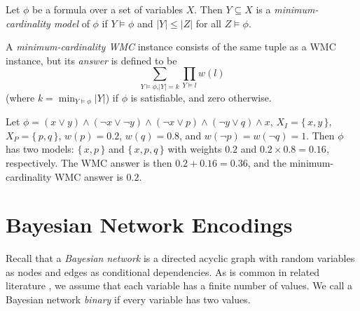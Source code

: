 \begin{definition}
  Let $\phi$ be a formula over a set of variables $X$. Then $Y \subseteq X$ is a
  \emph{minimum-cardinality model} of $\phi$ if $Y \models \phi$ and $|Y| \le
  |Z|$ for all $Z \models \phi$.
\end{definition}

\begin{definition}\label{def:mcwmc}
  A \emph{minimum-cardinality WMC} instance consists of the same tuple as a WMC
  instance, but its \emph{answer} is defined to be
  \[
  \sum_{Y \models \phi\text{,}|Y| = k} \prod_{Y \models l} w(l)
  \]
  (where $k = \min_{Y \models \phi} |Y|$) if $\phi$ is satisfiable, and zero otherwise.
\end{definition}

\begin{example}\label{example:1}
  Let
  $\phi = (x \lor y) \land (\neg x \lor \neg y) \land (\neg x \lor p) \land (\neg y \lor q) \land x$,
  $X_I = \{\, x, y \,\}$, $X_P = \{\, p, q \,\}$, $w(p) = 0.2$, $w(q) = 0.8$,
  and $w(\neg p) = w(\neg q) = 1$. Then $\phi$ has two models: $\{\, x, p \,\}$
  and $\{\, x, p, q \,\}$ with weights $0.2$ and $0.2 \times 0.8 = 0.16$,
  respectively. The WMC answer is then $0.2 + 0.16 = 0.36$, and the
  minimum-cardinality WMC answer is $0.2$.
\end{example}

\section{Bayesian Network Encodings}\label{sec:encodings}

Recall that a \emph{Bayesian network} is a directed acyclic graph with random
variables as nodes and edges as conditional dependencies. As is common in
related literature \citep{DBLP:conf/kr/Darwiche02,DBLP:conf/aaai/SangBK05}, we
assume that each variable has a finite number of values. We call a Bayesian
network \emph{binary} if every variable has two values.

